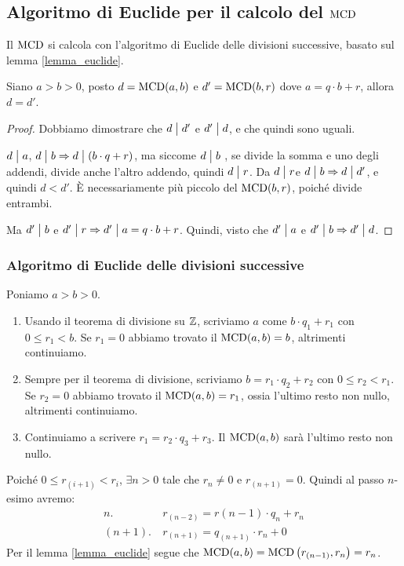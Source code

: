 \subsection{Algoritmo di Euclide per il calcolo del $\operatorname{MCD}$}

Il $\operatorname{MCD}$ si calcola con l'algoritmo di Euclide delle divisioni successive, basato sul lemma \ref{lemma_euclide}.
\begin{lem}\label{lemma_euclide}
Siano $a > b > 0$, posto $d = \operatorname{MCD}(a,b)$ e $d' = \operatorname{MCD}(b, r)$ dove $a = q \cdot b + r$, allora $d = d'$.
\end{lem}
\begin{proof}
Dobbiamo dimostrare che $d \bigm| d'$ e $d' \bigm| d$, e che quindi sono uguali.

$d \bigm| a$, $d \bigm| b \Rightarrow d \bigm| ( b \cdot q + r )$, ma siccome $d \bigm| b$ , se divide la somma e uno degli addendi, divide anche l'altro addendo, quindi $d \bigm| r$. Da $d \bigm| r$e $d \bigm| b \Rightarrow d \bigm| d'$, e quindi $d < d'$. \`E necessariamente pi\`u piccolo del $\operatorname{MCD}(b, r)$, poich\'e divide entrambi.

Ma $d' \bigm| b $ e $ d' \bigm| r \Rightarrow d' \bigm| a = q \cdot b + r $. Quindi, visto che $ d' \bigm| a$ e $ d' \bigm| b \Rightarrow d' \bigm| d$.
\end{proof}

\subsubsection{Algoritmo di Euclide delle divisioni successive}
Poniamo $a > b > 0$.
\begin{enumerate}
    \item Usando il teorema di divisione su $\mathbb{Z}$, scriviamo $a $ come $ b \cdot q_1 + r_1$ con $0 \le r_1 < b$. Se $r_1 = 0$ abbiamo trovato il $\operatorname{MCD}(a,b) = b$, altrimenti continuiamo.
    \item Sempre per il teorema di divisione, scriviamo $b = r_1 \cdot q_2 + r_2$ con $0 \le r_2 < r_1$. Se $r_2 = 0$ abbiamo trovato il $\operatorname{MCD}(a,b) = r_1$, ossia l'ultimo resto non nullo, altrimenti continuiamo.
    \item Continuiamo a scrivere $r_{1} = r_{2} \cdot q_{3} + r_{3}$. Il $\operatorname{MCD}(a,b)$ sar\`a l'ultimo resto non nullo.
\end{enumerate}
Poich\'e $0 \le r_{(i+1)} < r_i$, $\exists n > 0$ tale che $r_{n} \neq 0$ e $r_{(n+1)} = 0$. Quindi al passo $n$-esimo avremo:
\begin{align*}
n. & \ r_{(n-2)} = r{(n-1)} \cdot q_n + r_n \\
(n+1). & \ r_{(n+1)} = q_{(n+1)} \cdot r_n + 0
\end{align*}
Per il lemma \ref{lemma_euclide} segue che $\operatorname{MCD}(a,b) = \operatorname{MCD} \left( r_{(n-1)}, r_{n} \right) = r_{n}$.


